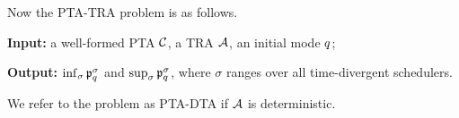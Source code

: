 
Now the {\sc PTA-TRA} problem is as follows.

\begin{compactitem}
\item {\bf Input:} a well-formed PTA $\mathcal{C}$, a TRA $\mathcal{A}$, an initial mode $q$;
\item {\bf Output:} $\inf_\sigma \mathfrak{p}_{q}^{\sigma}$ and $\sup_\sigma  \mathfrak{p}_{q}^{\sigma}$, where $\sigma$ ranges over all time-divergent schedulers.
\end{compactitem}

We refer to the problem as PTA-DTA if $\mathcal{A}$ is deterministic.



